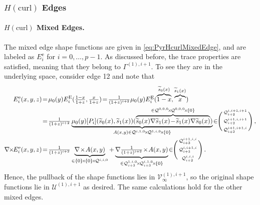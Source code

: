 \subsubsection{\texorpdfstring{$H(\mathrm{curl})$}{Hcurl} Edges}

\paragraph{\texorpdfstring{$H(\mathrm{curl})$}{Hcurl} Mixed Edges.}
The mixed edge shape functions are given in \eqref{eq:PyrHcurlMixedEdge}, and are labeled as $E_i^\mathrm{e}$ for $i=0,\ldots,p-1$.
As discussed before, the trace properties are satisfied, meaning that they belong to $\Gamma^{(1),i+1}$.
To see they are in the underlying space, consider edge 12 and note that
\begin{equation}
\begin{aligned}
	E_i^\mathrm{e}(x,y,z)&\!=\!\mu_0(y)E_i^\E(\textstyle{\frac{1-x}{1+z}},\textstyle{\frac{x}{1+z}})
		\!=\!\textstyle{\frac{1}{(1+z)^{i+2}}}\mu_0(y)E_i^\E(\overbrace{1-x}^{\tilde{s}_0(x)},\overbrace{x}^{\tilde{s}_1(x)})\\
	&\!=\!\textstyle{\frac{1}{(1+z)^{i+2}}}\underbrace{\mu_0(y)[P_i](\tilde{s}_0(x),\tilde{s}_1(x))
			(\overbrace{\tilde{s}_0(x)\nabla\tilde{s}_1(x)\!-\!\tilde{s}_1(x)\nabla\tilde{s}_0(x)}^{
				\in\mathcal{Q}^{0,0,0}\!\times\!\mathcal{Q}^{0,0,0}\!\times\!\{0\}})}_{
					A(x,y)\in\mathcal{Q}^{i,1,0}\!\times\!\mathcal{Q}^{1,i,0}\!\times\!\{0\}}
						\!\in\!\!\Bigg(\begin{smallmatrix}\mathcal{Q}_{i+2}^{i,i+1,i+1}\\[2pt]\mathcal{Q}_{i+2}^{i+1,i,i+1}\\[2pt]	
							\mathcal{Q}_{i+2}^{i+1,i+1,i}\end{smallmatrix}\Bigg)\,,\\
	\nabla\!\!\times\!\! E_i^\mathrm{e}(x,y,z)&\!=\!
		\textstyle{\frac{1}{(1+z)^{i+2}}}\underbrace{\nabla\!\times\! A(x,y)}_{
			\in\{0\}\!\times\!\{0\}\!\times\!\mathcal{Q}^{i,i,0}}
			+\underbrace{\nabla\textstyle{\frac{1}{(1+z)^{i+2}}}\!\times\! A(x,y)}_{
				\in\mathcal{Q}_{i+3}^{1,i,0}\!\times\!\mathcal{Q}_{i+3}^{i,1,0}\!\times\!\{0\}}
					\!\in\!\!\Bigg(\begin{smallmatrix}\mathcal{Q}_{i+3}^{i+1,i,i}\\[2pt]\mathcal{Q}_{i+3}^{i,i+1,i}\\[2pt]	
						\mathcal{Q}_{i+2}^{i,i,i}\end{smallmatrix}\Bigg)\,.
\end{aligned}
\end{equation}
Hence, the pullback of the shape functions lies in $\mathcal{V}_\infty^{(1),i+1}$, so the original shape functions lie in $\mathcal{U}^{(1),i+1}$ as desired.
The same calculations hold for the other mixed edges.

